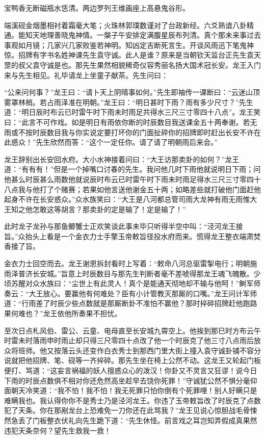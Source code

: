 \documentclass[12pt,UTF8]{ctexbook}
\begin{document}
{宝鸭香无断磁瓶水恁清。两边罗列王维画座上高悬鬼谷形。

端溪砚金烟墨相衬着霜毫大笔；火珠林郭璞数谨对了台政新经。六爻熟谙八卦精通。能知天地理善晓鬼神情。一槃子午安排定满腹星辰布列清。真个那未来事过去事观如月镜；几家兴几家败鉴若神明。知凶定吉断死言生。开谈风雨迅下笔鬼神惊。招牌有字书名姓神课先生袁守诚。此人是谁？原来是当朝钦天监台正先生袁天罡的叔父袁守诚是也。那先生果然相貌稀奇仪容秀丽名扬大国术冠长安。龙王入门来与先生相见。礼毕请龙上坐童子献茶。先生问曰：

“公来问何事？”龙王曰：“请卜天上阴晴事如何。”先生即袖传一课断曰：“云迷山顶雾罩林梢。若占雨泽准在明朝。”龙王曰：“明日甚时下雨？雨有多少尺寸？”先生道：“明日辰时布云已时雷午时下雨未时雨足共得水三尺三寸零四十八点”。龙王笑曰：“此言不可作戏。如是明日有雨依你断的时辰数目我送课金五十两奉谢。若无雨或不按时辰数目我与你实说定要打坏你的门面扯碎你的招牌即时赶出长安不许在此惑众！”先生欣然而答：“这个一定任你。请了请了明朝雨后来会。”

龙王辞别出长安回水府。大小水神接着问曰：“大王访那卖卦的如何？”龙王道：“有有有！”但是一个掉嘴口讨春的先生。我问他几时下雨他就说明日下雨；问他甚么时辰甚么雨数他就说辰时布云已时雷午时下雨未时雨足得水三尺三寸零四十八点我与他打了个赌赛；若果如他言送他谢金五十两；如略差些就打破他门面赶他起身不许在长安惑众。”众水族笑曰：“大王是八河都总管司雨大龙神有雨无雨惟大王知之他怎敢这等胡言？那卖卦的定是输了！定是输了！”

此时龙子龙孙与那鱼鲫蟹士正欢笑谈此事未毕只听得半空中叫：“泾河龙王接旨。”众抬头上看是一个金衣力士手擎玉帝敕旨径投水府而来。慌得龙王整衣端肃焚香接了旨。

金衣力士回空而去。龙王谢恩拆封看时上写着：“敕命八河总驱雷掣电行；明朝施雨泽普济长安城。”旨意上时辰数目与那先生判断者毫不差唬得那龙王魂飞魄散。少顷苏醒对众水族曰：“尘世上有此灵人！真个是能通天彻地却不输与他呵！”鲥军师奏云：“大王放心。要赢他有何难处？臣有小计管教灭那厮的口嘴。”龙王问计军师道：“行雨差了时辰少些点数就是那厮断卦不准怕不赢他？那时捽碎招牌赶他跑路果何难也？”龙王依他所奏果不担忧。

至次日点札风伯、雷公、云童、电母直至长安城九霄空上。他挨到那巳时方布云午时雷未时落雨申时雨止却只得三尺零四十点改了他一个时辰克了他三寸八点雨后放众将班师。他又按落云头还变作白衣秀士到那西门里大街上撞入袁守诚卦铺不容分说就把他招牌、笔、砚等一齐捽碎。那先生坐在椅上公然不动。这龙王又轮起门板便打、骂道：“这妄言祸福的妖人擅惑众心的泼汉！你卦又不灵言又狂谬！说今日下雨的时辰点数俱不相对你还危然高坐趁早去饶你死罪！”守诚犹公然不惧分毫仰面朝天冷笑道：“我不怕！我不怕！我无死罪只怕你倒有个死罪哩！别人好瞒只是难瞒我也。我认得你你不是秀士乃是泾河龙王。你违了玉帝敕旨改了时辰克了点数犯了天条。你在那剐龙台上恐难免一刀你还在此骂我？”龙王见说心惊胆战毛骨悚然急丢了门板整衣伏礼向先生跪下道：“先生休怪。前言戏之耳岂知弄假成真果然违犯天条奈何？望先生救我一救！

}
\end{document}
